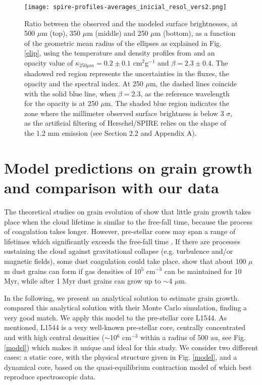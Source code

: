 \documentclass{aa}
\begin{document}
\begin{figure} 
\begin{center}
\texttt{[image: spire-profiles-averages\_inicial\_resol\_vers2.png]}
\end{center}
\caption{Ratio between the observed and the modeled surface brightnesses, at 500 $\mu$m (top), 350 $\mu$m (middle) and 250 $\mu$m (bottom), as a function of the geometric mean radius of the ellipses as explained in Fig. \ref{elip}, using the temperature and density profiles from  and an opacity value of $\kappa_{250\mu m} = 0.2 \pm 0.1$ cm$^2$g$^{-1}$ and $\beta=2.3 \pm 0.4$. The shadowed red region represents the uncertainties in the fluxes, the opacity and the spectral index. At 250 $\mu$m, the dashed lines coincide with the solid blue line, when $\beta=2.3$, as the reference wavelength for the opacity is at 250 $\mu$m. The shaded blue region indicates the zone where the millimeter observed surface brightness is below 3 $\sigma$, as the artificial filtering of Herschel/SPIRE relies on the shape of the 1.2 mm emission (see Section 2.2 and Appendix A).}
\label{profiles_spire}
\end{figure}



\section{Model predictions on grain growth and comparison with our data} \label{model_sec}

The theoretical studies on grain evolution of  show that little grain growth takes place when the cloud lifetime is similar to the free-fall time, because the process of coagulation takes longer. However, pre-stellar cores may span a range of lifetimes which significantly exceeds the free-fall time \citep[see e.g.]{2014Natur.516..219B, 2015ApJ...804...98K, 2015A&A...584A..91K}. If there are processes sustaining the cloud against gravitational collapse (e.g. turbulence and/or magnetic fields), some dust coagulation could take place.  show that about 100 $\mu$m dust grains can form if gas densities of 10$^5$ cm$^{-3}$ can be maintained for 10 Myr, while after 1 Myr dust grains can grow up to $\sim$4 $\mu$m. 

In the following, we present an analytical solution  to estimate grain growth.  compared this analytical solution with their Monte Carlo simulation, finding a very good match. We apply this model to the pre-stellar core L1544. As mentioned, L1544 is a very well-known pre-stellar core, centrally concentrated and with high central densities ($\sim$10$^6$ cm$^{-3}$ within a radius of 500 au, see Fig. \ref{model}) which makes it unique and ideal for this study. We consider two different cases: a static core, with the physical structure given in Fig. \ref{model}, and a dynamical core, based on the quasi-equilibrium contraction model of  which best reproduce spectroscopic data.
\end{document}
